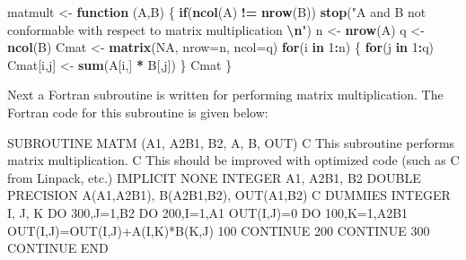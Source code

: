 \documentclass[
]{book}
\newenvironment{Shaded}{\begin{snugshade}}{\end{snugshade}}
\newcommand{\AttributeTok}[1]{\textcolor[rgb]{0.13,0.29,0.53}{#1}}
\newcommand{\ConstantTok}[1]{\textcolor[rgb]{0.56,0.35,0.01}{#1}}
\newcommand{\ControlFlowTok}[1]{\textcolor[rgb]{0.13,0.29,0.53}{\textbf{#1}}}
\newcommand{\DecValTok}[1]{\textcolor[rgb]{0.00,0.00,0.81}{#1}}
\newcommand{\FunctionTok}[1]{\textcolor[rgb]{0.13,0.29,0.53}{\textbf{#1}}}
\newcommand{\NormalTok}[1]{#1}
\newcommand{\OtherTok}[1]{\textcolor[rgb]{0.56,0.35,0.01}{#1}}
\newcommand{\SpecialCharTok}[1]{\textcolor[rgb]{0.81,0.36,0.00}{\textbf{#1}}}
\newcommand{\StringTok}[1]{\textcolor[rgb]{0.31,0.60,0.02}{#1}}
\begin{document}
\begin{Shaded}
\begin{Highlighting}[]
\NormalTok{matmult }\OtherTok{\textless{}{-}} \ControlFlowTok{function}\NormalTok{ (A,B) }
\NormalTok{ \{ }\ControlFlowTok{if}\NormalTok{(}\FunctionTok{ncol}\NormalTok{(A) }\SpecialCharTok{!=} \FunctionTok{nrow}\NormalTok{(B)) }\FunctionTok{stop}\NormalTok{(}\StringTok{"A and B not conformable with                 }
\StringTok{                       respect to matrix multiplication }\SpecialCharTok{\textbackslash{}n}\StringTok{"}\NormalTok{)}
\NormalTok{   n }\OtherTok{\textless{}{-}} \FunctionTok{nrow}\NormalTok{(A)}
\NormalTok{   q }\OtherTok{\textless{}{-}} \FunctionTok{ncol}\NormalTok{(B)}
\NormalTok{   Cmat }\OtherTok{\textless{}{-}} \FunctionTok{matrix}\NormalTok{(}\ConstantTok{NA}\NormalTok{, }\AttributeTok{nrow=}\NormalTok{n, }\AttributeTok{ncol=}\NormalTok{q)}
   \ControlFlowTok{for}\NormalTok{(i }\ControlFlowTok{in} \DecValTok{1}\SpecialCharTok{:}\NormalTok{n)}
\NormalTok{      \{ }\ControlFlowTok{for}\NormalTok{(j }\ControlFlowTok{in} \DecValTok{1}\SpecialCharTok{:}\NormalTok{q) Cmat[i,j] }\OtherTok{\textless{}{-}} \FunctionTok{sum}\NormalTok{(A[i,] }\SpecialCharTok{*}\NormalTok{ B[,j])}
\NormalTok{      \}}
\NormalTok{  Cmat}
\NormalTok{  \}}
\end{Highlighting}
\end{Shaded}

Next a Fortran subroutine is written for performing matrix multiplication. The Fortran code for this subroutine is given below:

\begin{Shaded}
\begin{Highlighting}[]
\NormalTok{      SUBROUTINE MATM (A1, A2B1, B2, A, B, OUT)}
\NormalTok{C     This subroutine performs matrix multiplication.}
\NormalTok{C     This should be improved with optimized code (such as }
\NormalTok{C     from Linpack, etc.)}
\NormalTok{      IMPLICIT NONE}
\NormalTok{      INTEGER A1, A2B1, B2}
\NormalTok{      DOUBLE PRECISION A(A1,A2B1), B(A2B1,B2), OUT(A1,B2)}
\NormalTok{C     DUMMIES}
\NormalTok{      INTEGER I, J, K}
\NormalTok{      DO 300,J=1,B2}
\NormalTok{        DO 200,I=1,A1}
\NormalTok{          OUT(I,J)=0}
\NormalTok{          DO 100,K=1,A2B1}
\NormalTok{            OUT(I,J)=OUT(I,J)+A(I,K)*B(K,J)}
\NormalTok{100   CONTINUE}
\NormalTok{200   CONTINUE}
\NormalTok{300   CONTINUE}
\NormalTok{      END}
\end{Highlighting}
\end{Shaded}
\end{document}
